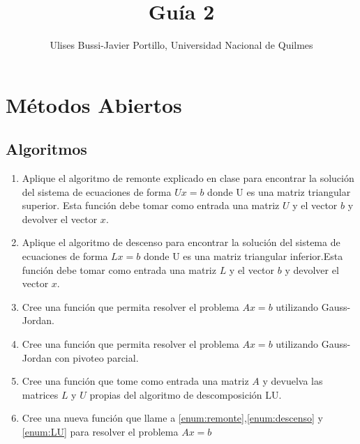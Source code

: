 \documentclass[a4paper,11pt]{article}
\makeatletter
\theoremstyle{mytheor}
\renewcommand{\maketitle}{
\colorbox{gray!20}{\framebox[\linewidth]{ \huge \textsc{\@title} } 
\lfoot{\@title}
}

}
\makeatother
\begin{document}
\title{Guía 2}

\author{Ulises Bussi-Javier Portillo, Universidad Nacional de Quilmes}


\maketitle \vspace{20pt}

\section*{Métodos Abiertos}
%

\subsection*{Algoritmos}

\begin{enumerate}[label=\Roman*]

\item \label{enum:remonte} Aplique el algoritmo de remonte explicado en clase para encontrar la solución del sistema de ecuaciones de forma $U x =b$ donde U es una matriz triangular superior. Esta función debe tomar como entrada una matriz $U$ y el vector $b$ y devolver el vector $x$.

\item \label{enum:descenso} Aplique el algoritmo de descenso para encontrar la solución del sistema de ecuaciones de forma $L x =b$ donde U es una matriz triangular inferior.Esta función debe tomar como entrada una matriz $L$ y el vector $b$ y devolver el vector $x$.



\item \label{enum:gaussJordan} Cree una función que permita resolver el problema $A x=b$ utilizando Gauss-Jordan.

\item \label{enum:pivot} Cree una función que permita resolver el problema $A x=b$ utilizando Gauss-Jordan con pivoteo parcial.


\item \label{enum:LU} Cree una función que tome como entrada una matriz $A$ y devuelva las matrices $L$ y $U$ propias del algoritmo de descomposición LU.


\item \label{enum:errStop} Cree una nueva función que llame a \ref{enum:remonte},\ref{enum:descenso} y \ref{enum:LU} para resolver el problema $A x=b$


\end{enumerate}
\end{document}
